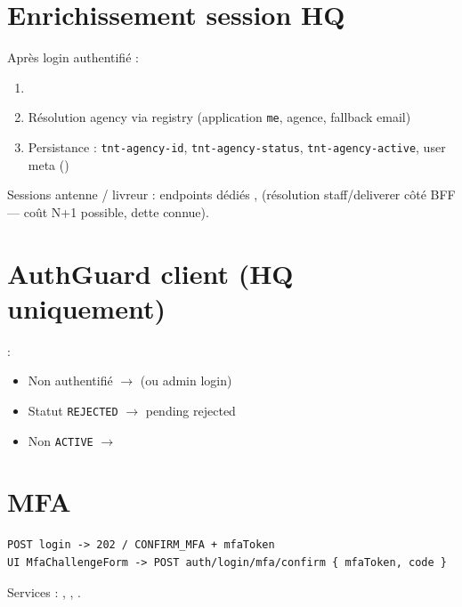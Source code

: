 \section{Enrichissement session HQ}

Après login authentifié :
\begin{enumerate}
  \item {}
  \item Résolution agency via registry (application \texttt{me}, agence, fallback email)
  \item Persistance : \texttt{tnt-agency-id}, \texttt{tnt-agency-status},
        \texttt{tnt-agency-active}, user meta ()
\end{enumerate}

Sessions antenne / livreur : endpoints dédiés
,  (résolution staff/deliverer
côté BFF --- coût N+1 possible, dette connue).

\section{AuthGuard client (HQ uniquement)}

 :
\begin{itemize}
  \item Non authentifié $\rightarrow$  (ou admin login)
  \item Statut \texttt{REJECTED} $\rightarrow$ pending rejected
  \item Non \texttt{ACTIVE} $\rightarrow$ 
\end{itemize}

\section{MFA}

\begin{lstlisting}
POST login -> 202 / CONFIRM_MFA + mfaToken
UI MfaChallengeForm -> POST auth/login/mfa/confirm { mfaToken, code }
\end{lstlisting}

Services : , ,
.
